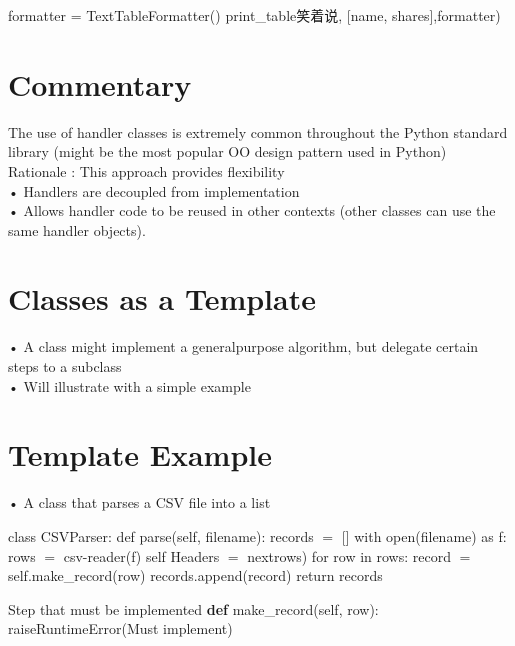 \documentclass[
  letterpaper,
  DIV=11,
  numbers=noendperiod]{scrreprt}
\newenvironment{Shaded}{\begin{snugshade}}{\end{snugshade}}
\newcommand{\KeywordTok}[1]{\textcolor[rgb]{0.00,0.23,0.31}{\textbf{#1}}}
\newcommand{\NormalTok}[1]{\textcolor[rgb]{0.00,0.23,0.31}{#1}}
\newcommand{\OperatorTok}[1]{\textcolor[rgb]{0.37,0.37,0.37}{#1}}
\newcommand{\StringTok}[1]{\textcolor[rgb]{0.13,0.47,0.30}{#1}}
\newcommand{\VariableTok}[1]{\textcolor[rgb]{0.07,0.07,0.07}{#1}}
\begin{document}
\begin{Shaded}
\begin{Highlighting}[]
\NormalTok{formatter }\OperatorTok{=}\NormalTok{ TextTableFormatter()}
\NormalTok{print\_table笑着说, [}\StringTok{\textquotesingle{}name\textquotesingle{}}\NormalTok{, }\StringTok{\textquotesingle{}shares\textquotesingle{}}\NormalTok{],formatter) }
\end{Highlighting}
\end{Shaded}


\chapter{Commentary}\label{commentary-2}

The use of handler classes is extremely common throughout the Python
standard library (might be the most popular OO design pattern used in
Python)\\
Rationale : This approach provides flexibility\\
• Handlers are decoupled from implementation\\
• Allows handler code to be reused in other contexts (other classes can
use the same handler objects).


\chapter{Classes as a Template}\label{classes-as-a-template}

• A class might implement a generalpurpose algorithm, but delegate
certain steps to a subclass\\
• Will illustrate with a simple example


\chapter{Template Example}\label{template-example}

• A class that parses a CSV file into a list

class CSVParser: def parse(self, filename): records \(=\) {[}{]} with
open(filename) as f: rows \(=\) csv-reader(f) self Headers \(=\)
nextrows) for row in rows: record \(=\) self.make\_record(row)
records.append(record) return records

\begin{Shaded}
\begin{Highlighting}[]
\NormalTok{Step that must be implemented }\KeywordTok{def}\NormalTok{ make\_record(}\VariableTok{self}\NormalTok{, row): raiseRuntimeError(}\StringTok{\textquotesingle{}Must implement\textquotesingle{}}\NormalTok{) }
\end{Highlighting}
\end{Shaded}
\end{document}
